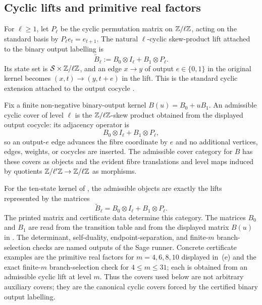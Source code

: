 \subsection{Cyclic lifts and primitive real factors}

For \(\ell\ge 1\), let \(P_\ell\) be the cyclic permutation matrix on
\(\mathbb{Z}/\ell\mathbb{Z}\), acting on the standard basis by
\(P_\ell e_t=e_{t+1}\). The natural \(\ell\)-cyclic skew-product lift attached to the binary output
labelling is
\[
  \widetilde B_\ell:=B_0\otimes I_\ell+B_1\otimes P_\ell.
\]
Its state set is \(\mathcal S\times\mathbb{Z}/\ell\mathbb{Z}\), and an edge
\(x\to y\) of output \(e\in\{0,1\}\) in the original kernel becomes
\((x,t)\to(y,t+e)\) in the lift. This is the standard cyclic extension
attached to the output cocycle
\cite{AdlerKitchensMarcus1985,Fiebig1993,BoyleSchmieding2017}.

\begin{definition}
  \label{def:admissible-cyclic-cover}
  Fix a finite non-negative binary-output kernel
  \(B(u)=B_0+uB_1\).  An admissible cyclic cover of level \(\ell\) is the
  \(\mathbb{Z}/\ell\mathbb{Z}\)-skew product obtained from the displayed output cocycle:
  its adjacency operator is
  \[
    B_0\otimes I_\ell+B_1\otimes P_\ell,
  \]
  so an output-\(e\) edge advances the fibre coordinate by \(e\) and no
  additional vertices, edges, weights, or cocycles are inserted.  The
  admissible cover category for \(B\) has these covers as objects and
  the evident fibre translations and level maps induced by quotients
  \(\mathbb{Z}/\ell'\mathbb{Z}\to\mathbb{Z}/\ell\mathbb{Z}\) as morphisms.

  For the ten-state kernel of , the admissible
  objects are exactly the lifts represented by the matrices
  \[
    \widetilde B_\ell=B_0\otimes I_\ell+B_1\otimes P_\ell.
  \]
  The printed matrix and certificate data determine this category.  The
  matrices \(B_0\) and \(B_1\) are read from the transition table and
  from the displayed matrix \(B(u)\) in
  .  The determinant, self-duality,
  endpoint-separation, and finite-\(m\) branch-selection checks are
  named outputs of the Sage runner.  Concrete
  certificate examples are the primitive real factors for
  \(m=4,6,8,10\) displayed in
  \,\textup{(e)} and the exact
  finite-\(m\) branch-selection check for \(4\le m\le31\); each is
  obtained from an admissible cyclic lift at level \(m\).  Thus the
  covers used below are not arbitrary auxiliary covers; they are the
  canonical cyclic covers forced by the certified binary output
  labelling.
\end{definition}

